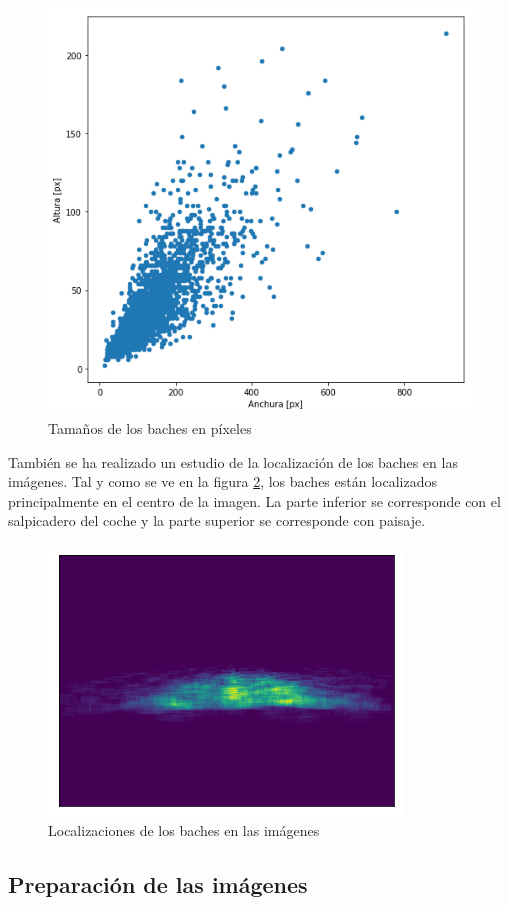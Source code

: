 \begin{figure}[H]
	\centering
	\includegraphics[width=0.7\linewidth]{images/pothole_sizes_scatter_plot.png}
	\caption{Tamaños de los baches en píxeles}
	\label{fig:potholesizes}
\end{figure}

También se ha realizado un estudio de la localización de los baches en las imágenes. Tal y como se ve en la figura \ref{fig:potholeslocations}, los baches están localizados principalmente en el centro de la imagen. La parte inferior se corresponde con el salpicadero del coche y la parte superior se corresponde con paisaje.

\begin{figure}[H]
	\centering
	\includegraphics[width=0.7\linewidth]{images/pothole_locations_heatmap.png}
	\caption{Localizaciones de los baches en las imágenes}
	\label{fig:potholeslocations}
\end{figure}

\subsection{Preparación de las imágenes}
\label{subsec:preprocesamiento_de_las_imagenes}

